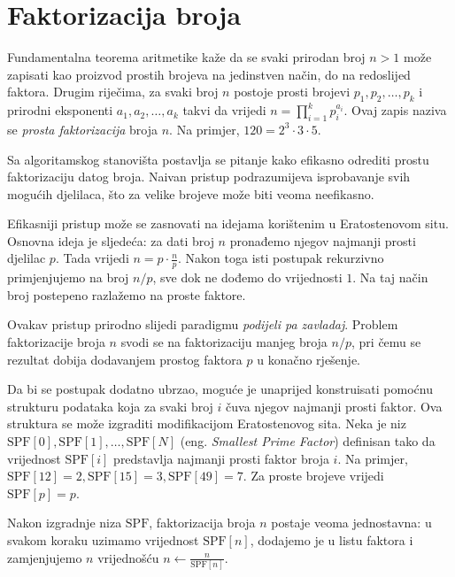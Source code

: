 \section{Faktorizacija broja}

Fundamentalna teorema aritmetike kaže da se svaki prirodan broj $n>1$ može zapisati kao proizvod prostih brojeva na jedinstven način, do na redoslijed faktora. Drugim riječima, za svaki broj $n$ postoje prosti brojevi $p_1,p_2,\ldots,p_k$ i prirodni eksponenti $a_1,a_2,\ldots,a_k$ takvi da vrijedi $n=\prod_{i=1}^{k} p_i^{a_i}.$ Ovaj zapis naziva se \textit{prosta faktorizacija} broja $n$. Na primjer, $
120 = 2^3 \cdot 3 \cdot 5.$

\medskip

Sa algoritamskog stanovišta postavlja se pitanje kako efikasno odrediti prostu faktorizaciju datog broja. Naivan pristup podrazumijeva isprobavanje svih mogućih djelilaca, što za velike brojeve može biti veoma neefikasno.

Efikasniji pristup može se zasnovati na idejama korištenim u Eratostenovom situ. Osnovna ideja je sljedeća: za dati broj $n$ pronađemo njegov najmanji prosti djelilac $p$. Tada vrijedi $
n = p \cdot \frac{n}{p}.$ Nakon toga isti postupak rekurzivno primjenjujemo na broj $n/p$, sve dok ne dođemo do vrijednosti $1$. Na taj način broj postepeno razlažemo na proste faktore.

\medskip

Ovakav pristup prirodno slijedi paradigmu \textit{podijeli pa zavladaj}. Problem faktorizacije broja $n$ svodi se na faktorizaciju manjeg broja $n/p$, pri čemu se rezultat dobija dodavanjem prostog faktora $p$ u konačno rješenje.

\medskip

Da bi se postupak dodatno ubrzao, moguće je unaprijed konstruisati pomoćnu strukturu podataka koja za svaki broj $i$ čuva njegov najmanji prosti faktor. Ova struktura se može izgraditi modifikacijom Eratostenovog sita. Neka je niz $
\textrm{SPF}[0], \textrm{SPF}[1], \ldots, \textrm{SPF}[N]$ (eng. \emph{Smallest Prime Factor}) definisan tako da vrijednost $\textrm{SPF}[i]$ predstavlja najmanji prosti faktor broja $i$. Na primjer, $
\textrm{SPF}[12]=2,
\textrm{SPF}[15]=3,
\textrm{SPF}[49]=7.$ Za proste brojeve vrijedi $ \textrm{SPF}[p]=p. $

Nakon izgradnje niza $\textrm{SPF}$, faktorizacija broja $n$ postaje veoma jednostavna: u svakom koraku uzimamo vrijednost $\textrm{SPF}[n]$, dodajemo je u listu faktora i zamjenjujemo $n$ vrijednošću $n \leftarrow \frac{n}{\textrm{SPF}[n]}.$

